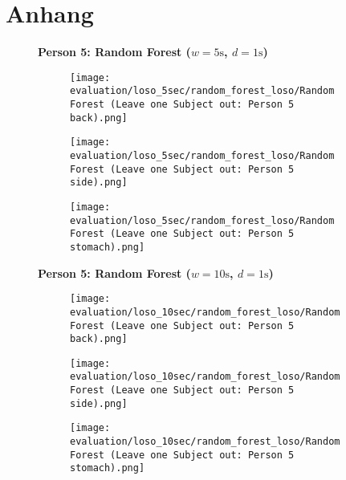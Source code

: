 \chapter{Anhang}
\label{ch:anhang}
%

\begin{figure}
    \textbf{Person 5: Random Forest ($w=5\si{\s}$, $d=1\si{\s}$)}
      \centering
      \begin{subfigure}{1\textwidth}
          \texttt{[image: evaluation/loso\_5sec/random\_forest\_loso/Random Forest (Leave one Subject out: Person 5 back).png]}
        \end{subfigure}
        \begin{subfigure}{1\textwidth}
          \texttt{[image: evaluation/loso\_5sec/random\_forest\_loso/Random Forest (Leave one Subject out: Person 5 side).png]}
        \end{subfigure}
        \begin{subfigure}{1\textwidth}
          \texttt{[image: evaluation/loso\_5sec/random\_forest\_loso/Random Forest (Leave one Subject out: Person 5 stomach).png]}
      \end{subfigure}
        \textbf{Person 5: Random Forest ($w=10\si{\s}$, $d=1\si{\s}$)}
      \centering
      \begin{subfigure}{1\textwidth}
          \texttt{[image: evaluation/loso\_10sec/random\_forest\_loso/Random Forest (Leave one Subject out: Person 5 back).png]}
        \end{subfigure}
        \begin{subfigure}{1\textwidth}
          \texttt{[image: evaluation/loso\_10sec/random\_forest\_loso/Random Forest (Leave one Subject out: Person 5 side).png]}
        \end{subfigure}
        \begin{subfigure}{1\textwidth}
          \texttt{[image: evaluation/loso\_10sec/random\_forest\_loso/Random Forest (Leave one Subject out: Person 5 stomach).png]}
      \end{subfigure}
  
      \label{evaluation:xgboost_loso:person6}
\end{figure}
